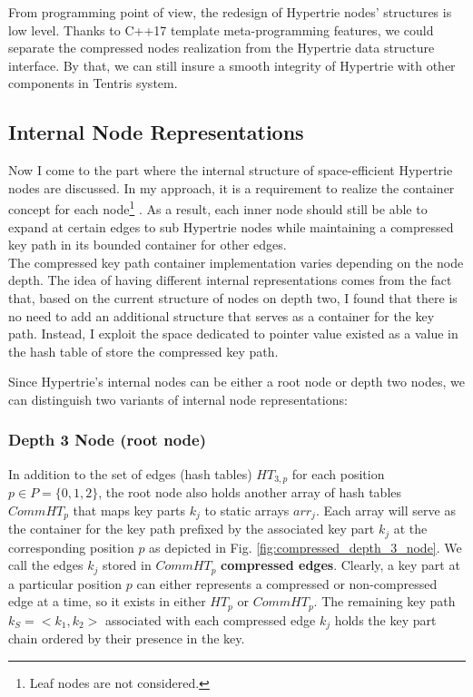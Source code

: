 From programming point of view, the redesign of Hypertrie nodes' structures is low level. Thanks to C++17 template meta-programming features, we could separate the compressed nodes realization from the Hypertrie data structure interface. By that, we can still insure a smooth integrity of Hypertrie with other components in Tentris system. \\

\subsection{Internal Node Representations}
\label{ch:approach_node_structure}
Now I come to the part where the internal structure of space-efficient Hypertrie nodes are discussed. 
In my approach, it is a requirement to realize the container concept for each node\footnote{Leaf nodes are not considered.} . 
As a result, each inner node should still be able to expand at certain edges to sub Hypertrie nodes while maintaining a compressed key path in its bounded container for other edges. \\

The compressed key path container implementation varies depending on the node depth. 
The idea of having different internal representations comes from the fact that, based on the current structure of nodes on depth two, I found that there is no need to add an additional structure that serves as a container for the key path. 
Instead, I exploit the space dedicated to pointer value existed as a value in the hash table of store the compressed key path. \\ 


Since Hypertrie's internal nodes can be either a root node or depth two nodes, we can distinguish two variants of internal node representations: 

\subsubsection{Depth 3 Node (root node)} 
In addition to the set of edges (hash tables) $HT_{3,p}$ for each position $p \in P = \{0, 1, 2\}$, the root node also holds another array of hash tables $CommHT_{p}$ that maps key parts $k_{j}$ to static arrays $arr_{j}$. 
Each array will serve as the container for the key path prefixed by the associated key part $k_{j}$ at the corresponding position $p$ as depicted in Fig. \ref{fig:compressed_depth_3_node}. 
We call the edges $k_{j}$ stored  in $CommHT_{p}$ \textbf{compressed edges}. Clearly, a key part at a particular position $p$ can either represents a compressed or non-compressed edge at a time, so it exists in either $HT_{p}$ or $CommHT_{p}$. 
The remaining key path $k_{S} = <k_{1}, k_{2}>$ associated with each compressed edge $k_{j}$ holds the key part chain ordered by their presence in the key. \\

